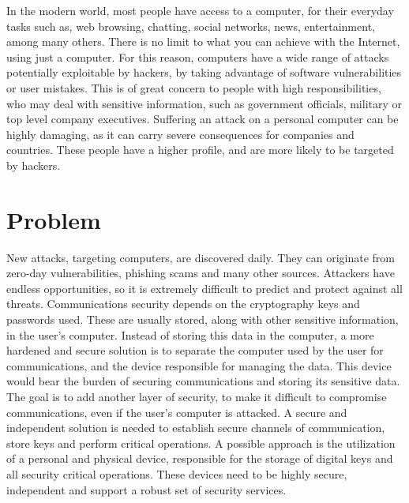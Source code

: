 \cleardoublepage
\label{chap:intro}

In the modern world, most people have access to a computer, for their everyday tasks such as, web browsing, chatting, social networks, news, entertainment, among many others.
There is no limit to what you can achieve with the Internet, using just a computer.
For this reason, computers have a wide range of attacks potentially exploitable by hackers, by taking advantage of software vulnerabilities or user mistakes.
This is of great concern to people with high responsibilities, who may deal with sensitive information, such as government officials, military or top level company executives.
Suffering an attack on a personal computer can be highly damaging, as it can carry severe consequences for companies and countries.
These people have a higher profile, and are more likely to be targeted by hackers.

\section{Problem}\label{chap:intro:problem}

New attacks, targeting computers, are discovered daily.
They can originate from zero-day vulnerabilities, phishing scams and many other sources. Attackers have endless opportunities, so it is extremely difficult to predict and protect against all threats.
Communications security depends on the cryptography keys and passwords used. These are usually stored, along with other sensitive information, in the user's computer.
Instead of storing this data in the computer, a more hardened and secure solution is to separate the computer used by the user for communications, and the device responsible for managing the data. This device would bear the burden of securing communications and storing its sensitive data.
The goal is to add another layer of security, to make it difficult to compromise communications, even if the user's computer is attacked.
A secure and independent solution is needed to establish secure channels of communication, store keys and perform critical operations.%
A possible approach is the utilization of a personal and physical device, responsible for the storage of digital keys and all security critical operations.
These devices need to be highly secure, independent and support a robust set of security services. %


